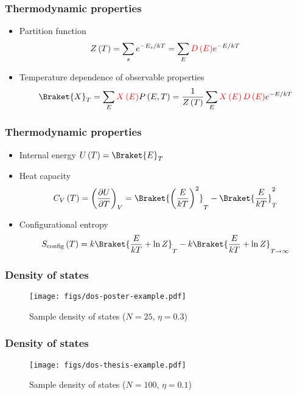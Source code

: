 \documentclass{beamer}
\newcommand{\bk}{\Braket} %
\newcommand{\p}[1]{\left(#1\right)} %
\newcommand{\f}[2]{\dfrac{#1}{#2}}
\renewcommand{\d}{\partial}
\let\olditem\item
\renewcommand{\item}{\setlength{\itemsep}{6pt}\olditem}
\begin{document}
\begin{frame}
  \frametitle{Thermodynamic properties}
  \begin{itemize}
  \item Partition function
    \begin{align*}
      Z\p{T}=\sum_se^{-E_s/kT}=\sum_E{\color{red}D\p{E}}e^{-E/kT}
    \end{align*}
  \item<2> Temperature dependence of observable properties
    \begin{align*}
      \bk{X}_T=\sum_E{\color{red} X\p{E}}P\p{E,T}
      =\f1{Z\p{T}}\sum_E{\color{red}X\p{E}D\p{E}}e^{-E/kT}
    \end{align*}
  \end{itemize}
\end{frame}

\begin{frame}
  \frametitle{Thermodynamic properties}
  \begin{itemize}
  \item Internal energy $U\p{T}=\bk{E}_T$
  \item Heat capacity
    \begin{align*}
      C_V\p{T}=\p{\f{\d U}{\d T}}_V
      =\bk{\p{\f{E}{kT}}^2}_T-\bk{\f{E}{kT}}_T^2
    \end{align*}
  \item Configurational entropy
  \begin{align*}
    S_{\text{config}}\p{T} =k\bk{\f{E}{kT}+\ln Z}_T
    -k\bk{\f{E}{kT}+\ln Z}_{T\to\infty}
  \end{align*}

  \end{itemize}
\end{frame}

\begin{frame}
  \frametitle{Density of states}
  \begin{figure}
    \centering
    \texttt{[image: figs/dos-poster-example.pdf]}
    \caption{Sample density of states ($N=25$, $\eta=0.3$)}
  \end{figure}
\end{frame}

\begin{frame}
  \frametitle{Density of states}
  \begin{figure}
    \centering
    \texttt{[image: figs/dos-thesis-example.pdf]}
    \caption{Sample density of states ($N=100$, $\eta=0.1$)}
  \end{figure}
\end{frame}
\end{document}
